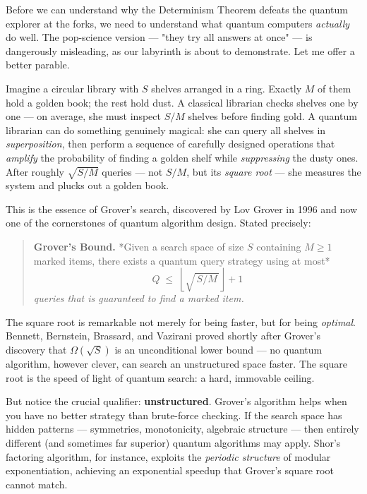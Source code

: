 \documentclass[11pt,openany]{book}
\theoremstyle{definition}
\theoremstyle{plain}
\theoremstyle{remark}
\begin{document}
Before we can understand why the Determinism Theorem defeats the quantum explorer at the forks, we need to understand what quantum computers \textit{actually} do well. The pop-science version — "they try all answers at once" — is dangerously misleading, as our labyrinth is about to demonstrate. Let me offer a better parable.

Imagine a circular library with $S$ shelves arranged in a ring. Exactly $M$ of them hold a golden book; the rest hold dust. A classical librarian checks shelves one by one — on average, she must inspect $S / M$ shelves before finding gold. A quantum librarian can do something genuinely magical: she can query all shelves in \textit{superposition}, then perform a sequence of carefully designed operations that \textit{amplify} the probability of finding a golden shelf while \textit{suppressing} the dusty ones. After roughly $\sqrt{S / M}$ queries — not $S / M$, but its \textit{square root} — she measures the system and plucks out a golden book.

This is the essence of Grover's search, discovered by Lov Grover in 1996 and now one of the cornerstones of quantum algorithm design. Stated precisely:

\begin{quote}
\textbf{Grover's Bound.} *Given a search space of size $S$ containing $M \geq 1$ marked items, there exists a quantum query strategy using at most*
$$Q \;\leq\; \left\lfloor \sqrt{\,S / M\,} \right\rfloor + 1$$
\textit{queries that is guaranteed to find a marked item.}
\end{quote}


The square root is remarkable not merely for being faster, but for being \textit{optimal}. Bennett, Bernstein, Brassard, and Vazirani proved shortly after Grover's discovery that $\Omega(\sqrt{S})$ is an unconditional lower bound — no quantum algorithm, however clever, can search an unstructured space faster. The square root is the speed of light of quantum search: a hard, immovable ceiling.

But notice the crucial qualifier: \textbf{unstructured}. Grover's algorithm helps when you have no better strategy than brute-force checking. If the search space has hidden patterns — symmetries, monotonicity, algebraic structure — then entirely different (and sometimes far superior) quantum algorithms may apply. Shor's factoring algorithm, for instance, exploits the \textit{periodic structure} of modular exponentiation, achieving an exponential speedup that Grover's square root cannot match.
\end{document}
